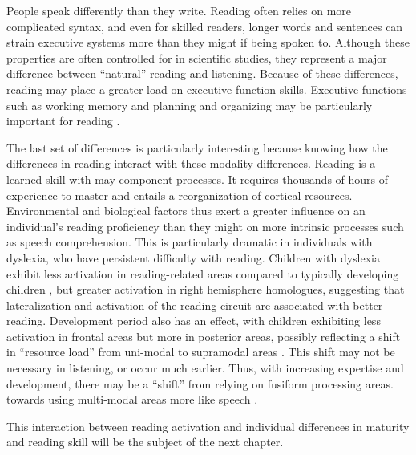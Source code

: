 People speak differently than they write. Reading often relies on more complicated syntax, and even for skilled readers, longer words and sentences can strain executive systems more than they might if being spoken to. Although these properties are often controlled for in scientific studies, they represent a major difference between “natural” reading and listening. Because of these differences, reading may place a greater load on executive function skills. Executive functions such as working memory and planning and organizing may be particularly important for reading \citep{Cain2006}.  

\begin{table}
	\renewcommand{\tabcolsep}{0.09cm}
	\centering
	
	\caption[Summary of findings for Study 1.]{}
	\label{table:ch3-results}
\end{table}

The last set of differences is particularly interesting because knowing how the differences in reading interact with these modality differences. Reading is a learned skill with may component processes. It requires thousands of hours of experience to master and entails a reorganization of cortical resources. Environmental and biological factors thus exert a greater influence on an individual’s reading proficiency than they might on more intrinsic processes such as speech comprehension. This is particularly dramatic in individuals with dyslexia, who have persistent difficulty with reading. Children with dyslexia exhibit less activation in reading-related areas compared to typically developing children \citep{Pugh2000}, but greater activation in right hemisphere homologues, suggesting that lateralization and activation of the reading circuit are associated with better reading. Development period also has an effect, with children exhibiting less activation in frontal areas but more in posterior areas, possibly reflecting a shift in “resource load” from uni-modal to supramodal areas \citep{Berl2011}. This shift may not be necessary in listening, or occur much earlier. Thus, with increasing expertise and development, there may be a “shift” from relying on fusiform processing areas. towards using multi-modal areas more like speech \citep{Monzalvo2013}. 

This interaction between reading activation and individual differences in maturity and reading skill will be the subject of the next chapter.
